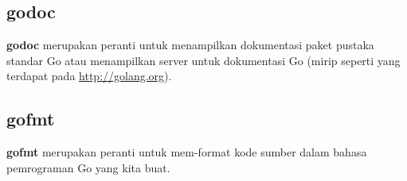 \subsection{godoc}

\textbf{godoc} merupakan peranti untuk menampilkan dokumentasi paket pustaka standar Go atau menampilkan server untuk dokumentasi Go (mirip seperti yang terdapat pada \url{http://golang.org}).



\subsection{gofmt}

\textbf{gofmt} merupakan peranti untuk mem-format kode sumber dalam bahasa pemrograman Go yang kita buat.


